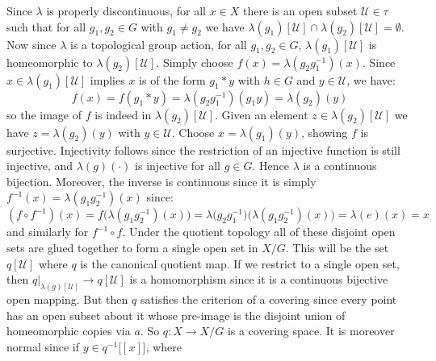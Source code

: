     \begin{bproof}
        Since $\lambda$ is properly discontinuous, for all $x\in{X}$ there is an
        open subset $\mathcal{U}\in\tau$ such that for all $g_{1},g_{2}\in{G}$
        with $g_{1}\ne{g}_{2}$ we have
        $\lambda(g_{1})[\mathcal{U}]\cap\lambda(g_{2})[\mathcal{U}]=\emptyset$.
        Now since $\lambda$ is a topological group action, for all
        $g_{1},g_{2}\in{G}$, $\lambda(g_{1})[\mathcal{U}]$ is homeomorphic to
        $\lambda(g_{2})[\mathcal{U}]$. Simply choose
        $f(x)=\lambda(g_{2}g_{1}^{\minus{1}})(x)$. Since
        $x\in\lambda(g_{1})[\mathcal{U}]$ implies $x$ is of the form
        $g_{1}*y$ with $h\in{G}$ and $y\in\mathcal{U}$, we have:
        \begin{equation}
            f(x)=f(g_{1}*y)=\lambda(g_{2}g_{1}^{\minus{1}})(g_{1}y)
            =\lambda(g_{2})(y)
        \end{equation}
        so the image of $f$ is indeed in $\lambda(g_{2})[\mathcal{U}]$. Given an
        element $z\in\lambda(g_{2})[\mathcal{U}]$ we have $z=\lambda(g_{2})(y)$
        with $y\in\mathcal{U}$. Choose
        $x=\lambda(g_{1})(y)$, showing $f$ is surjective. Injectivity follows
        since the restriction of an injective function is still injective, and
        $\lambda(g)(\cdot)$ is injective for all $g\in{G}$. Hence $\lambda$ is a
        continuous bijection. Moreover, the inverse is continuous since it is
        simply $f^{\minus{1}}(x)=\lambda(g_{1}g_{2}^{\minus{1}})(x)$ since:
        \begin{equation}
            (f\circ{f}^{\minus{1}})(x)
            =f\big(\lambda(g_{1}g_{2}^{\minus{1}})(x)\big)
            =\lambda\big(g_{2}g_{1}^{\minus{1}}\big)
            \big(\lambda(g_{1}g_{2}^{\minus{1}})(x)\big)=\lambda(e)(x)=x
        \end{equation}
        and similarly for $f^{\minus{1}}\circ{f}$. Under the quotient topology
        all of these disjoint open sets are glued together to form a single open
        set in $X/G$. This will be the set $q[\mathcal{U}]$ where $q$ is the
        canonical quotient map. If we restrict to a single open set, then
        $q|_{\lambda(g)[\mathcal{U}]}\rightarrow{q}[\mathcal{U}]$ is a
        homomorphism since it is a continuous bijective open mapping. But then
        $q$ satisfies the criterion of a covering since every point has an open
        subset about it whose pre-image is the disjoint union of homeomorphic
        copies via $a$. So $q:X\rightarrow{X}/G$ is a covering space. It is
        moreover normal since if $y\in{q}^{\minus{1}}\big[[x]\big]$, where

\end{bproof}
